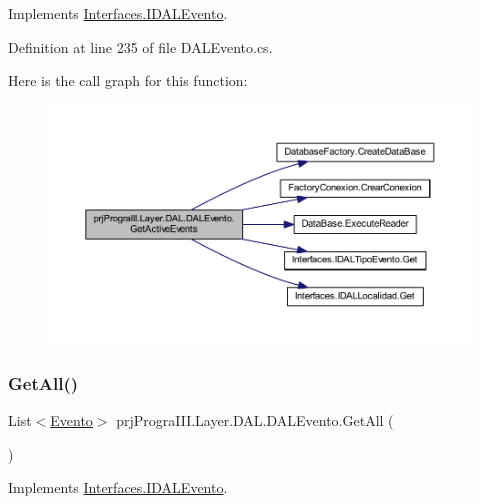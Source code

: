 Implements \hyperlink{interface_interfaces_1_1_i_d_a_l_evento_ab7b63b6b4b49fea14ead7a91733ed973}{Interfaces.\+I\+D\+A\+L\+Evento}.



Definition at line 235 of file D\+A\+L\+Evento.\+cs.

Here is the call graph for this function\+:
\nopagebreak
\begin{figure}[H]
\begin{center}
\leavevmode
\includegraphics[width=350pt]{classprj_progra_i_i_i_1_1_layer_1_1_d_a_l_1_1_d_a_l_evento_ad6d492b77a450533f979d1a67993fb17_cgraph}
\end{center}
\end{figure}
\hypertarget{classprj_progra_i_i_i_1_1_layer_1_1_d_a_l_1_1_d_a_l_evento_a513523b7c4cb6204629239b3c06c3baa}{}\label{classprj_progra_i_i_i_1_1_layer_1_1_d_a_l_1_1_d_a_l_evento_a513523b7c4cb6204629239b3c06c3baa} 
\subsubsection{\texorpdfstring{Get\+All()}{GetAll()}}
{\footnotesize\ttfamily List$<$\hyperlink{classprj_progra_i_i_i_1_1_layer_1_1_entities_1_1_evento}{Evento}$>$ prj\+Progra\+I\+I\+I.\+Layer.\+D\+A\+L.\+D\+A\+L\+Evento.\+Get\+All (\begin{DoxyParamCaption}{ }\end{DoxyParamCaption})}



Implements \hyperlink{interface_interfaces_1_1_i_d_a_l_evento_a5e84cfafdfe63179fa12003120e4d1cf}{Interfaces.\+I\+D\+A\+L\+Evento}.



